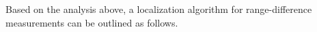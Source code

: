 Based on the analysis above, a localization algorithm for range-difference measurements can be outlined as follows.


